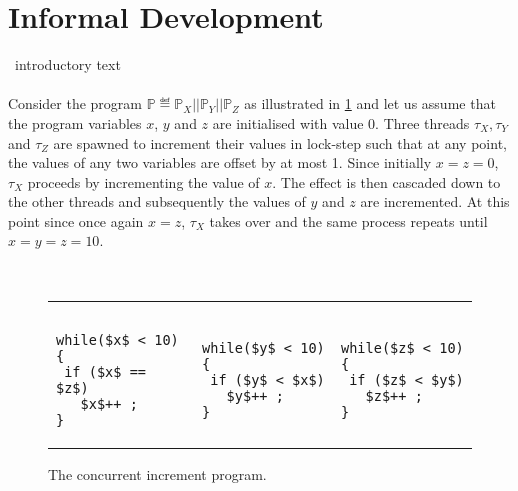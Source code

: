 \section{Informal Development}\label{sec:intuition}
\todo\ introductory text\\\\
Consider the program $\mathbb{P} \eqdef \mathbb{P}_X || \mathbb{P}_Y || \mathbb{P}_Z$ as illustrated in \fig\ref{fig:concurrentInc} and let us assume that the program variables $x$, $y$ and $z$ are initialised with value $0$. Three threads $\tau_X, \tau_Y$ and $\tau_Z$ are spawned to increment their values in lock-step such that at any point, the values of any two variables are offset by at most 1. Since initially $x=z=0$, $\tau_X$ proceeds by incrementing the value of $x$. The effect is then cascaded down to the other threads and subsequently the values of $y$ and $z$ are incremented. At this point since once again $x = z$, $\tau_X$ takes over and the same process repeats until $x = y = z = 10$. 
%
%
\begin{figure}
\noindent\makebox[\linewidth]{\rule{\linewidth}{1pt}} \vspace*{-5pt}\\
\begin{tabular}{@{}l@{\ }||@{\ }l@{\ }||@{\ }l@{}}
	\color{blue}{$\mathbb{P}_X$ :}& 
	\color{blue}{$\mathbb{P}_Y$ :}& 
	\color{blue}{$\mathbb{P}_Z$ :} \\
	 &&\vspace*{-5pt}\\
\begin{lstlisting}[mathescape]
while($x$ < 10){
 if ($x$ == $z$) 
   $x$++ ;
}
\end{lstlisting}
&
\begin{lstlisting}[mathescape]
while($y$ < 10){
 if ($y$ < $x$) 
   $y$++ ;
}
\end{lstlisting}
&
\begin{lstlisting}[mathescape]
while($z$ < 10){
 if ($z$ < $y$) 
   $z$++ ;
}
\end{lstlisting}
\end{tabular}

\vspace*{5pt}\noindent\makebox[\linewidth]{\rule{\linewidth}{1pt}} \vspace*{-12pt}
\caption{The concurrent increment program.}
\label{fig:concurrentInc}
\end{figure}
%
%
%
%
